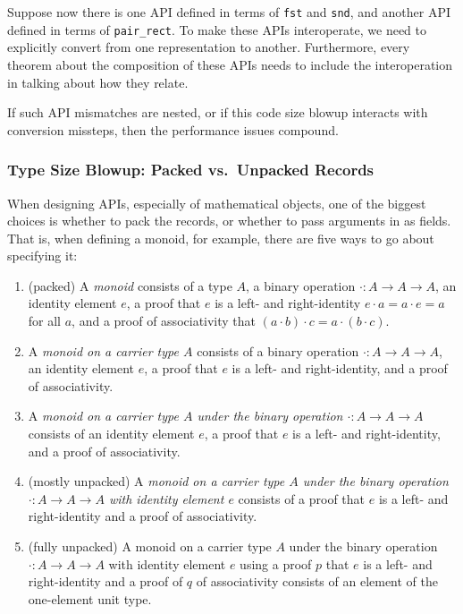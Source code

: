Suppose now there is one API defined in terms of \texttt{fst} and \texttt{snd}, and another API defined in terms of \texttt{pair_rect}.
To make these APIs interoperate, we need to explicitly convert from one representation to another.
Furthermore, every theorem about the composition of these APIs needs to include the interoperation in talking about how they relate.

If such API mismatches are nested, or if this code size blowup interacts with conversion missteps, then the performance issues compound.


\subsubsection{Type Size Blowup: Packed vs.~Unpacked Records}
When designing APIs, especially of mathematical objects, one of the biggest choices is whether to pack the records, or whether to pass arguments in as fields.
That is, when defining a monoid, for example, there are five ways to go about specifying it:
\begin{enumerate}
    \item
    (packed)
    A \emph{monoid} consists of a type $A$, a binary operation $\cdot : A \to A \to A$, an identity element $e$, a proof that $e$ is a left- and right-identity $e \cdot a = a \cdot e = a$ for all $a$, and a proof of associativity that $(a \cdot b) \cdot c = a \cdot (b \cdot c)$.
    \item
    A \emph{monoid on a carrier type $A$} consists of a binary operation $\cdot : A \to A \to A$, an identity element $e$, a proof that $e$ is a left- and right-identity, and a proof of associativity.
    \item
    A \emph{monoid on a carrier type $A$ under the binary operation $\cdot : A \to A \to A$} consists of an identity element $e$, a proof that $e$ is a left- and right-identity, and a proof of associativity.
    \item
    (mostly unpacked)
    A \emph{monoid on a carrier type $A$ under the binary operation $\cdot : A \to A \to A$ with identity element $e$} consists of a proof that $e$ is a left- and right-identity and a proof of associativity.
    \item
    (fully unpacked) A monoid on a carrier type $A$ under the binary operation $\cdot : A \to A \to A$ with identity element $e$ using a proof $p$ that $e$ is a left- and right-identity and a proof of $q$ of associativity consists of an element of the one-element unit type.
\end{enumerate}

